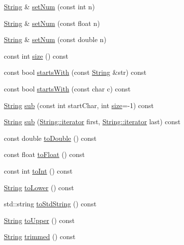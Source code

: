 \begin{DoxyCompactItemize}
\item 
\hyperlink{classprism_1_1_string}{String} \& \hyperlink{classprism_1_1_string_a347d7ae9b3e5dcbc8da9902cdd64c3ab}{set\+Num} (const int n)
\item 
\hyperlink{classprism_1_1_string}{String} \& \hyperlink{classprism_1_1_string_a5acc6453cfd4aca91dfe1e0b5162c95f}{set\+Num} (const float n)
\item 
\hyperlink{classprism_1_1_string}{String} \& \hyperlink{classprism_1_1_string_a873dc1a423545930d644acc8388b602d}{set\+Num} (const double n)
\item 
const int \hyperlink{classprism_1_1_string_a603b5a90681d43adf7c6c29018e0300c}{size} () const 
\item 
const bool \hyperlink{classprism_1_1_string_ae9ce1b5a274fc4b672944da555552456}{starts\+With} (const \hyperlink{classprism_1_1_string}{String} \&str) const 
\item 
const bool \hyperlink{classprism_1_1_string_a5ce3cf5ba78faa6c9179fb777cc4c6ac}{starts\+With} (const char c) const 
\item 
\hyperlink{classprism_1_1_string}{String} \hyperlink{classprism_1_1_string_a4249170c6ee2d8d409e7b2c1c66092e4}{sub} (const int start\+Char, int \hyperlink{classprism_1_1_string_a603b5a90681d43adf7c6c29018e0300c}{size}=-\/1) const 
\item 
\hyperlink{classprism_1_1_string}{String} \hyperlink{classprism_1_1_string_acb6b7f719571cccca2f08887e61ed2a5}{sub} (\hyperlink{classprism_1_1_string_adacc7975837e5fff95d70690777fb330}{String\+::iterator} first, \hyperlink{classprism_1_1_string_adacc7975837e5fff95d70690777fb330}{String\+::iterator} last) const 
\item 
const double \hyperlink{classprism_1_1_string_a9c8060a9bea6e9967e8b9714c04d6396}{to\+Double} () const 
\item 
const float \hyperlink{classprism_1_1_string_a4fcdc9050798010ab0b36a6e4ff053c9}{to\+Float} () const 
\item 
const int \hyperlink{classprism_1_1_string_afbf22d03096777ef6909794edc18a0f9}{to\+Int} () const 
\item 
\hyperlink{classprism_1_1_string}{String} \hyperlink{classprism_1_1_string_ac75330b46da019ccf2c964e4c2fd9f81}{to\+Lower} () const 
\item 
std\+::string \hyperlink{classprism_1_1_string_ad1018741610a6723a38ab52255147ac4}{to\+Std\+String} () const 
\item 
\hyperlink{classprism_1_1_string}{String} \hyperlink{classprism_1_1_string_afd1fc3691cbc2f267fc3d1d8f27d2c3a}{to\+Upper} () const 
\item 
\hyperlink{classprism_1_1_string}{String} \hyperlink{classprism_1_1_string_aef7dc34213c574a72c893f943a41e8e4}{trimmed} () const 
\end{DoxyCompactItemize}

